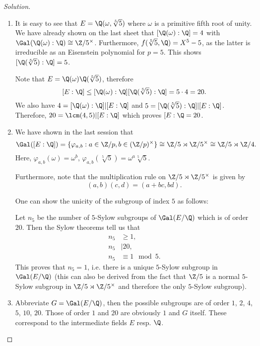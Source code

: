 \documentclass[a4paper,10pt,reqno]{amsart}
\newenvironment{sol}
  {\renewcommand\qedsymbol{$\blacksquare$}\begin{proof}[Solution]}
  {\end{proof}}
\begin{document}
\begin{sol}
    \begin{enumerate}[label=(\roman*)]

        \item It is easy to see that $E = \Q(\omega, \sqrt[5]{5})$ where $\omega$ is a primitive fifth root of unity. We have already shown on the last sheet that $[\Q(\omega):\Q] = 4$ with $\Gal(\Q(\omega):\Q) \cong \Z/5^{\times}$. Furthermore, $f(\sqrt[5]{5},\Q) = X^5 -5$, as the latter is irreducible as an Eisenstein polynomial for $p=5$. This shows $[\Q(\sqrt[5]{5}):\Q]=5$.

        Note that $E = \Q(\omega)\Q(\sqrt[5]{5})$, therefore
        \[
        [E:\Q] \leq [\Q(\omega):\Q][\Q(\sqrt[5]{5}):\Q] = 5\cdot 4 = 20.
        \]
        We also have $4 = [\Q(\omega):\Q] | [E:\Q]$ and $5 = [\Q(\sqrt[5]{5}):\Q] | [E:\Q]$. Therefore, $20 = \lcm(4,5) | [E:\Q]$ which proves $[E:\Q= 20$.

        \item We have shown in the last session that
        \[
        \Gal([E:\Q]) = \{ \varphi_{a,b}: a \in \Z/p, b \in (\Z/p)^{\times} \} \cong \Z/5 \rtimes \Z/5^{\times} \cong \Z/5  \rtimes \Z/4.
        \]
        Here, $\varphi_{a,b}(\omega) = \omega^b$, $\varphi_{a,b}(\sqrt[5]{5}) = \omega^a \sqrt[5]{5}$.

        Furthermore, note that the multiplication rule on $\Z/5 \rtimes \Z/5^{\times}$ is given by
        \[
        (a,b)(c,d) = (a + bc, bd).
        \]

        One can show the unicity of the subgroup of index $5$ as follows:

        Let $n_5$ be the number of $5$-Sylow subgroups of $\Gal(E/\Q)$ which is of order $20$. Then the Sylow theorems tell us that 
        \begin{align*}
            n_5 & \geq 1, \\
            n_5 & | 20, \\
            n_5 & \equiv 1 \mod 5.
        \end{align*}
    This proves that $n_5 = 1$, i.e. there is a unique $5$-Sylow subgroup in $\Gal(E/\Q)$ (this can also be derived from the fact that $\Z/5$ is a normal $5$-Sylow subgroup in $\Z/5 \rtimes \Z/5^{\times}$ and therefore the only $5$-Sylow subgroup).

    \item Abbreviate $G = \Gal(E/\Q)$, then the possible subgroups are of order $1$, $2$, $4$, $5$, $10$, $20$. Those of order $1$ and $20$ are obviously $1$ and $G$ itself. These correspond to the intermediate fields $E$ resp. $\Q$.
    

\end{enumerate}
\end{sol}
\end{document}
